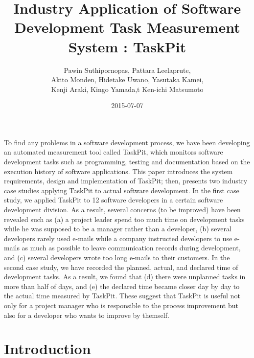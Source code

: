 \documentclass [paper]{ieice}
\title {Industry Application of Software Development Task Measurement System : TaskPit}
\author{Pawin Suthipornopas,
		Pattara Leelaprute, \\
		Akito Monden, 
		Hidetake Uwano, 
		Yasutaka Kamei, \\
		Kenji Araki, 
		Kingo Yamada,t 
		Ken-ichi Matsumoto}
\date {2015-07-07}
\begin{document}
\maketitle
\begin {summary}
	To find any problems in a software development process, we have been developing an automated measurement tool called TaskPit, which monitors software development tasks such as programming, testing and documentation based on the execution history of software applications. This paper introduces the system requirements, design and implementation of TaskPit; then, presents two industry case studies applying TaskPit to actual software development. In the first case study, we applied TaskPit to 12 software developers in a certain software development division. As a result, several concerns (to be improved) have been revealed such as (a) a project leader spend too much time on development tasks while he was supposed to be a manager rather than a developer, (b) several developers rarely used e-mails while a company instructed developers to use e-mails as much as possible to leave communication records during development, and (c) several developers wrote too long e-mails to their customers. In the second case study, we have recorded the planned, actual, and declared time of development tasks. As a result, we found that (d) there were unplanned tasks in more than half of days, and (e) the declared time became closer day by day to the actual time measured by TaskPit. These suggest that TaskPit is useful not only for a project manager who is responsible to the process improvement but also for a developer who wants to improve by themself.
\end {summary}
	
\section {Introduction}
	
\end{document}
